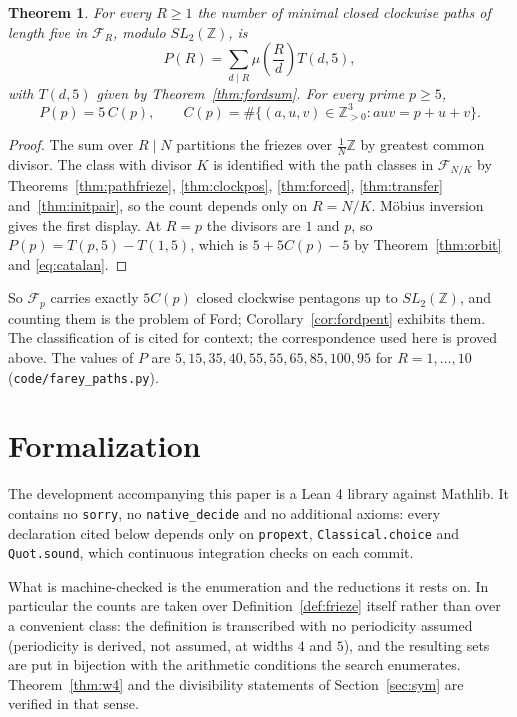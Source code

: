 \documentclass[11pt]{article}
\theoremstyle{plain}
\newtheorem{theorem}{Theorem}[section]
\theoremstyle{definition}
\newcommand{\Z}{\mathbb{Z}}
\newcommand{\lat}{\tfrac{1}{N}\Z}
\begin{document}
\begin{theorem}\label{thm:farey}
For every $R\ge1$ the number of minimal closed clockwise paths of length five in
$\mathcal F_R$, modulo $SL_2(\Z)$, is
\[
  P(R)=\sum_{d\mid R}\mu\!\left(\frac{R}{d}\right)T(d,5),
\]
with $T(d,5)$ given by Theorem~\ref{thm:fordsum}. For every prime $p\ge5$,
\[
  P(p)=5\,C(p),\qquad C(p)=\#\{(a,u,v)\in\Z_{>0}^3 : auv=p+u+v\}.
\]
\end{theorem}

\begin{proof}
The sum over $R\mid N$ partitions the friezes over $\lat$ by greatest common divisor. The
class with divisor $K$ is identified with the path classes in $\mathcal F_{N/K}$ by
Theorems~\ref{thm:pathfrieze}, \ref{thm:clockpos}, \ref{thm:forced},
\ref{thm:transfer} and~\ref{thm:initpair}, so the count depends only on $R=N/K$. M\"obius inversion gives the first
display. At $R=p$ the divisors are $1$ and $p$, so $P(p)=T(p,5)-T(1,5)$, which is
$5+5C(p)-5$ by Theorem~\ref{thm:orbit} and \eqref{eq:catalan}.
\end{proof}

So $\mathcal F_p$ carries exactly $5C(p)$ closed clockwise pentagons up to $SL_2(\Z)$, and
counting them is the problem of Ford; Corollary~\ref{cor:fordpent} exhibits them. The
classification of \cite{KSSZ} is cited for context; the correspondence used here is proved
above. The values
of $P$ are $5,15,35,40,55,55,65,85,100,95$ for $R=1,\dots,10$
(\texttt{code/farey\_paths.py}).

\section{Formalization}\label{sec:lean}

The development accompanying this paper is a Lean 4 library against Mathlib. It contains no
\texttt{sorry}, no \texttt{native\_decide} and no additional axioms: every declaration cited
below depends only on \texttt{propext}, \texttt{Classical.choice} and \texttt{Quot.sound},
which continuous integration checks on each commit.

What is machine-checked is the enumeration and the reductions it rests on. In particular the
counts are taken over Definition~\ref{def:frieze} itself rather than over a convenient class:
the definition is transcribed with no periodicity assumed (periodicity is derived, not
assumed, at widths $4$ and $5$), and the resulting sets are put in bijection with the
arithmetic conditions the search enumerates. Theorem~\ref{thm:w4} and the divisibility
statements of Section~\ref{sec:sym} are verified in that sense.
\end{document}
